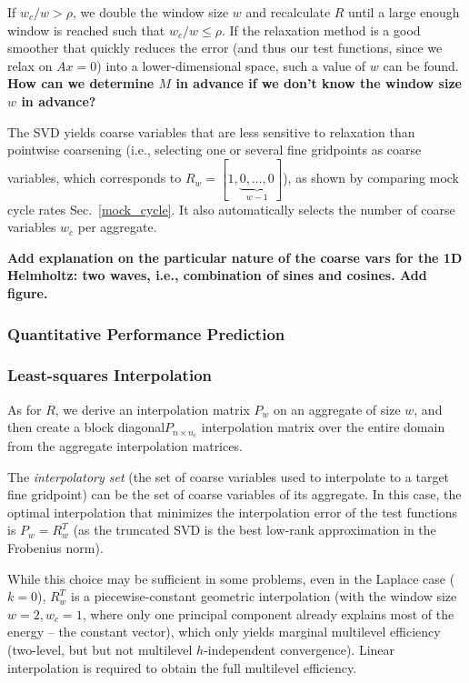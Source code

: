 \documentclass{article}
\begin{document}
If $w_c/w > \rho$, we double the window size $w$ and recalculate $R$ until a large enough window is reached such that $w_c/w \leq \rho$. If the relaxation method is a good smoother that quickly reduces the error (and thus our test functions, since we relax on $A x = 0$) into a lower-dimensional space, such a value of $w$ can be found.  {\bf How can we determine $M$ in advance if we don't know the window size $w$ in advance?}

The SVD yields coarse variables that are less sensitive to relaxation than pointwise coarsening (i.e., selecting one or several fine gridpoints as coarse variables, which corresponds to $R_w = [1,\underbrace{0,\dots,0}_{w-1}]$), as shown by comparing mock cycle rates Sec.~\ref{mock_cycle}. It also automatically selects the number of coarse variables $w_c$ per aggregate.

{\bf Add explanation on the particular nature of the coarse vars for the 1D Helmholtz: two waves, i.e., combination of sines and cosines. Add figure.}

\subsubsection{Quantitative Performance Prediction}

\subsubsection{Least-squares Interpolation}
As for $R$, we derive an interpolation matrix $P_w$ on an aggregate of size $w$, and then create a block diagonal$P_{n \times n_c}$ interpolation matrix over the entire domain from the aggregate interpolation matrices.

The \emph{interpolatory set} (the set of coarse variables used to interpolate to a target fine gridpoint) can be the set of coarse variables of its aggregate. In this case, the optimal interpolation that minimizes the interpolation error of the test functions is $P_w = R_w^T$ (as the truncated SVD is the best low-rank approximation in the Frobenius norm).

While this choice may be sufficient in some problems, even in the Laplace case ($k=0$), $R_w^T$ is a piecewise-constant geometric interpolation (with the window size $w = 2, w_c = 1$, where only one principal component already explains most of the energy -- the constant vector), which only yields marginal multilevel efficiency (two-level, but but not multilevel $h$-independent convergence). Linear interpolation is required to obtain the full multilevel efficiency.
\end{document}
